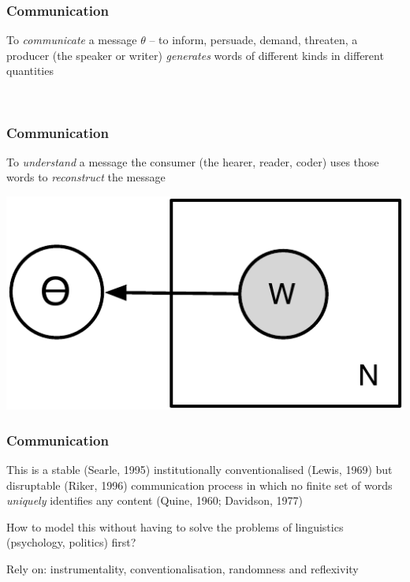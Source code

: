 \documentclass[11pt,compress,professionalfonts]{beamer}
\begin{document}
\begin{frame}[t]\frametitle{Communication}

To \textsl{communicate} a message $\theta$ -- to inform, persuade, demand, threaten, a producer (the speaker or writer) \textsl{generates} words of different kinds in different quantities


\begin{center}
 ~~ 
\end{center}


\end{frame}
\begin{frame}[t]\frametitle{Communication}

To \textsl{understand} a message the consumer (the hearer, reader, coder) uses those words to \textsl{reconstruct} the message

\begin{center}
\includegraphics[scale=.9]{pictures/inf-plate}
\end{center}



\end{frame}
\begin{frame}[t]\frametitle{Communication}

This is a stable (Searle, 1995) institutionally conventionalised (Lewis, 1969) but disruptable (Riker, 1996) communication process
in which no finite set of words \textsl{uniquely} identifies any content (Quine, 1960; Davidson, 1977)

How to model this without having to solve the problems of linguistics (psychology, politics) first?

Rely on: instrumentality, conventionalisation, randomness and reflexivity

\end{frame}
\end{document}
